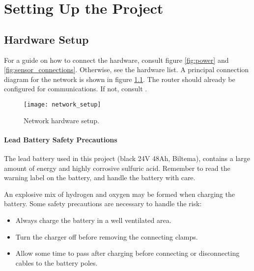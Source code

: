 \chapter{Setting Up the Project}

\section{Hardware Setup}

For a guide on how to connect the hardware, consult figure \ref{fig:power} and \ref{fig:sensor_connections}. Otherwise, see the hardware list. A principal connection diagram for the network is shown in figure \ref{fig:network_setup}. The router should already be configured for communications. If not, consult \cite{aspunvik}.

\begin{figure}[h]
	\centering
	\texttt{[image: network\_setup]}
	\caption{Network hardware setup. }
	\label{fig:network_setup}
\end{figure}

\subsubsection{Lead Battery Safety Precautions}

The lead battery used in this project (black 24V 48Ah, Biltema), contains a large amount of energy and highly corrosive sulfuric acid. Remember to read the warning label on the battery, and handle the battery with care. 

An explosive mix of hydrogen and oxygen may be formed when charging the battery. Some safety precautions are necessary to handle the risk:

\begin{itemize}
	\item Always charge the battery in a well ventilated area. 
	\item Turn the charger off before removing the connecting clamps.
	\item Allow some time to pass after charging before connecting or disconnecting cables to the battery poles.
\end{itemize} 

